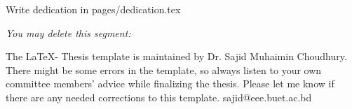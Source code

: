 Write dedication in pages/dedication.tex

\textit{You may delete this segment:}

The \LaTeX - Thesis template is maintained by Dr. Sajid Muhaimin Choudhury. There might be some errors in the template, so always listen to your own committee members'
advice while finalizing the thesis. Please let me know if there are any needed corrections to this template. sajid@eee.buet.ac.bd



\endinput
